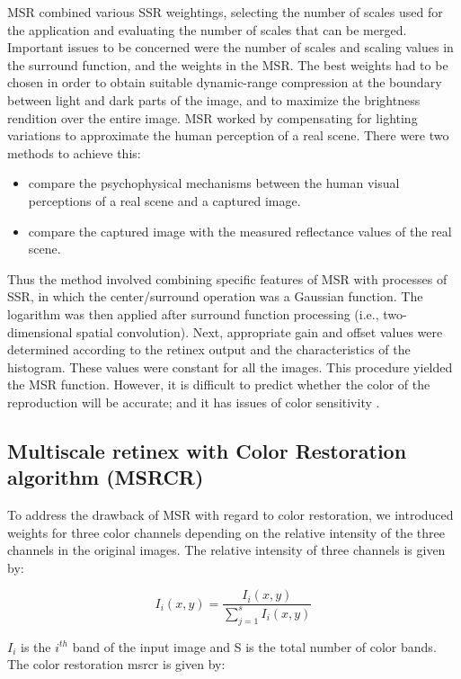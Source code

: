 MSR combined various SSR\cite{ssr} weightings, selecting the
number of scales used for the application and evaluating
the number of scales that can be merged. Important
issues to be concerned were the number of scales and
scaling values in the surround function, and the weights
in the MSR. The best weights had to be chosen in order
to obtain suitable dynamic-range compression at the
boundary between light and dark parts of the image, and
to maximize the brightness rendition \cite{msr} over the entire
image. MSR worked by compensating for lighting
variations to approximate the human perception of a real
scene. There were two methods to achieve this: 
\begin{itemize}
	\item compare the psychophysical mechanisms between the human visual perceptions of a real scene and 
	a captured image.
	\item compare the captured image with the measured reflectance values of the real scene. 
\end{itemize}
 

Thus the method involved combining specific features of
MSR\cite{msr} with processes of SSR\cite{ssr}, in which the
center/surround operation was a Gaussian function\cite{msr}. The
logarithm was then applied after surround function
processing (i.e., two-dimensional spatial convolution).
Next, appropriate gain and offset values were determined according to the retinex output and the characteristics of
the histogram. These values were constant for all the
images. This procedure yielded the MSR function.
However, it is difficult to predict whether the color of the
reproduction will be accurate; and it has issues of color
sensitivity \cite{msr}.



\subsection{Multiscale retinex with Color Restoration algorithm (MSRCR)}
To address the drawback of MSR with regard to color
restoration, we introduced weights for three color
channels depending on the relative intensity of the three
channels in the original images\cite{msrcr}. The relative intensity of
three channels is given by:

\begin{equation}
	I_{i}(x,y)=\frac{I_{i}(x,y)}{\sum_{j=1}^{s}I_{i}(x,y)}
\end{equation}

$I_{i}$ is the $i^{th}$ band of the input image and S is the total
number of color bands. The color restoration {msrcr} is
given by:


